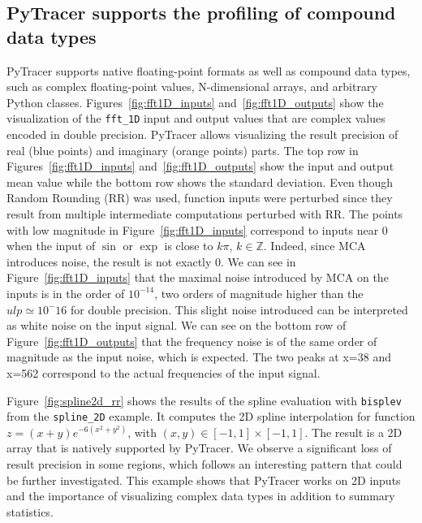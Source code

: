 \documentclass[10pt,journal,compsoc]{IEEEtran}
\newcommand{\pytracer}[0]{PyTracer\xspace}
\DeclareRobustCommand{\add}[1]{\textcolor{ao(english)}{#1}}%
\DeclareRobustCommand{\add}[1]{#1}
\begin{document}
\subsection{\pytracer supports the profiling of compound data types}

PyTracer supports native floating-point formats as well as compound
data types, such as complex floating-point values, N-dimensional arrays,
and arbitrary Python classes. Figures~\ref{fig:fft1D_inputs}
and~\ref{fig:fft1D_outputs} show the visualization of the
\texttt{fft\_1D} input and output values \add{that} are complex values
encoded in double precision. PyTracer allows visualizing the
result precision of real (blue points) and imaginary (orange
points) parts. The top row in Figures~\ref{fig:fft1D_inputs}
and~\ref{fig:fft1D_outputs} show the input \add{and output} mean value while the bottom
row shows the standard deviation. Even though Random Rounding
(RR) was used, function inputs were perturbed since they result from
multiple intermediate computations perturbed with RR. The points with
low magnitude in Figure~\ref{fig:fft1D_inputs} correspond to inputs
near 0 when the input of $\sin$ or $\exp$ is close to $k\pi$, $k \in
    \mathbb{Z}$. Indeed, since MCA introduces noise, the result is not
exactly 0. We can see in Figure~\ref{fig:fft1D_inputs} that the maximal
noise introduced by MCA on the inputs is in the order of $10^{-14}$,
two orders of magnitude higher than the $ulp \simeq 10^-16$ for double precision. This slight
noise introduced can be interpreted as white noise on the input signal. We can
see on the bottom row of Figure~\ref{fig:fft1D_outputs} that the frequency noise
is of the same order of magnitude as the input noise, which is expected. The
two peaks at x=38 and x=562 correspond to the actual frequencies of the input
signal.

Figure~\ref{fig:spline2d_rr} shows the results of the spline evaluation with
\texttt{bisplev} from the \texttt{spline\_2D} example. It computes the 2D spline
interpolation for function $z=(x+y)e^{-6(x^2+y^2)}$, with $(x,y) \in
    [-1,1]\times[-1,1]$. The result is a 2D array that is natively supported by
PyTracer. We observe a significant loss of result precision in some regions, which follows
an interesting pattern that could be further investigated.
\add{This example shows that \pytracer works on 2D inputs and the importance of
    visualizing complex data types in addition to summary statistics.}
\end{document}
